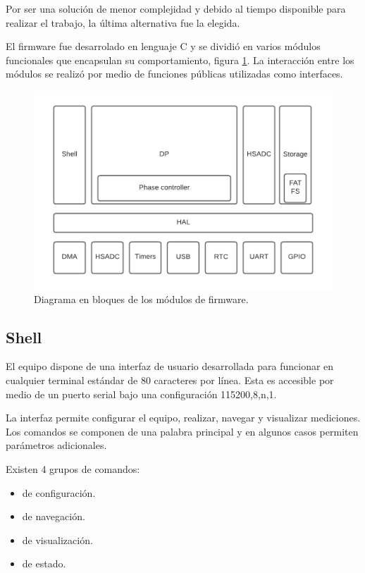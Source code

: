 \vspace{5mm}

Por ser una solución de menor complejidad y debido al tiempo disponible para realizar el trabajo, la última alternativa fue la elegida.

El firmware fue desarrolado en lenguaje C y se dividió en varios módulos funcionales que encapsulan su comportamiento, figura \ref{fig:firmBloques}. La interacción entre los módulos se realizó por medio de funciones públicas utilizadas como interfaces. 
\vspace{10mm}

\begin{figure}[ht]
	\centering
	\includegraphics[width=140mm]{./Figures/firmBloques.png}
	\caption{Diagrama en bloques de los módulos de firmware.}
	\label{fig:firmBloques}
\end{figure}


\subsection{Shell}
El equipo dispone de una interfaz de usuario desarrollada para funcionar en cualquier terminal estándar de 80 caracteres por línea. Esta es accesible por medio de un puerto serial bajo una configuración 115200,8,n,1.

La interfaz permite configurar el equipo, realizar, navegar y visualizar mediciones. Los comandos se componen de una palabra principal y en algunos casos permiten parámetros adicionales. 

\vspace{5mm}

Existen 4 grupos de comandos:
\begin{itemize}
\item  de configuración.
\item  de navegación.
\item  de visualización.
\item de estado. 

\end{itemize}


